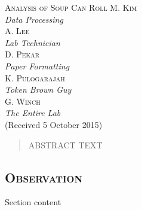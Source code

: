 \documentclass[12pt,notitlepage,twoside,draft]{article}
\begin{document}
  

\begin{center}
\huge
\textsc{Analysis of Soup Can Roll}
{\large\centering
\newline
\newline
\textsc{M. Kim\\}
\textit{\footnotesize Data Processing\\}
\large
\textsc{A. Lee\\}
\textit{\footnotesize Lab Technician\\}
\large
\textsc{D. Pekar\\}
\textit{\footnotesize Paper Formatting\\}
\large
\textsc{K. Pulogarajah\\}
\textit{\footnotesize Token Brown Guy\\}
\large
\textsc{G. Winch\\}
\textit{\footnotesize The Entire Lab\\}
\vspace{3mm}
\footnotesize
(Received 5 October 2015)\\}
\end{center}

\footnotesize
\begin{quotation}
\addtolength{\oddsidemargin}{-.875in}
\addtolength{\evensidemargin}{-.875in}
\addtolength{\textwidth}{1.75in}

\addtolength{\topmargin}{-.875in}
\addtolength{\textheight}{1.75in}
ABSTRACT TEXT
\end{quotation}
\large
\begin{multicols*}{2}
\begin{center}
\section{\textsc{Observation}}
\end{center}
Section content

\end{multicols*}
\end{document}
